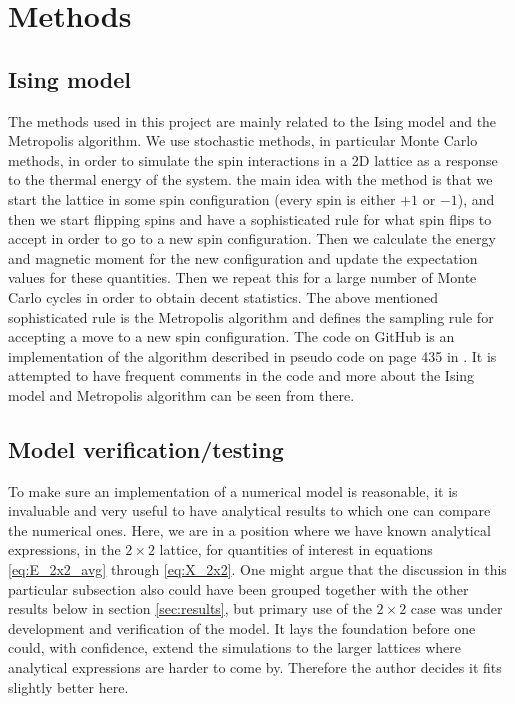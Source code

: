 \documentclass[12pt]{article}
\numberwithin{figure}{section}
\numberwithin{table}{section}
\begin{document}
\section{Methods}

\subsection{Ising model}
The methods used in this project are mainly related to the Ising model and the Metropolis algorithm\cite{Comp}. We use stochastic methods, in particular Monte Carlo methods, in order to simulate the spin interactions in a 2D lattice as a response to the thermal energy of the system. the main idea with the method is that we start the lattice in some spin configuration (every spin is either $+1$ or $-1$), and then we start flipping spins and have a sophisticated rule for what spin flips to accept in order to go to a new spin configuration. Then we calculate the energy and magnetic moment for the new configuration and update the expectation values for these quantities. Then we repeat this for a large number of Monte Carlo cycles in order to obtain decent statistics. The above mentioned sophisticated rule is the Metropolis algorithm and defines the sampling rule for accepting a move to a new spin configuration. The code on GitHub is an implementation of the algorithm described in pseudo code on page 435 in \cite{Comp}. It is attempted to have frequent comments in the code and more about the Ising model and Metropolis algorithm can be seen from there.

\subsection{Model verification/testing}
To make sure an implementation of a numerical model is reasonable, it is invaluable and very useful to have analytical results to which one can compare the numerical ones. Here, we are in a position where we have known analytical expressions, in the $2\times2$ lattice, for quantities of interest in equations \eqref{eq:E_2x2_avg} through \eqref{eq:X_2x2}. One might argue that the discussion in this particular subsection also could have been grouped together with the other results below in section \ref{sec:results}, but primary use of the $2\times2$ case was under development and verification of the model. It lays the foundation before one could, with confidence, extend the simulations to the larger lattices where analytical expressions are harder to come by. Therefore the author decides it fits slightly better here.
\vspace{0.30cm}
\end{document}
